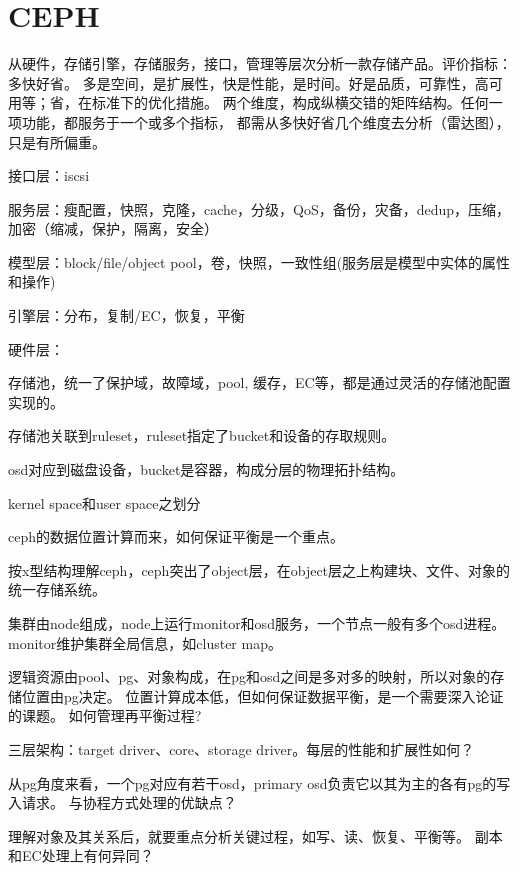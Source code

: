 \chapter{CEPH}

从硬件，存储引擎，存储服务，接口，管理等层次分析一款存储产品。评价指标：多快好省。
多是空间，是扩展性，快是性能，是时间。好是品质，可靠性，高可用等；省，在标准下的优化措施。
两个维度，构成纵横交错的矩阵结构。任何一项功能，都服务于一个或多个指标，
都需从多快好省几个维度去分析（雷达图），只是有所偏重。

\begin{enumbox}
\item 接口层：iscsi
\item 服务层：瘦配置，快照，克隆，cache，分级，QoS，备份，灾备，dedup，压缩，加密（缩减，保护，隔离，安全）
\item 模型层：block/file/object pool，卷，快照，一致性组(服务层是模型中实体的属性和操作)
\item 引擎层：分布，复制/EC，恢复，平衡
\item 硬件层：
\end{enumbox}

存储池，统一了保护域，故障域，pool, 缓存，EC等，都是通过灵活的存储池配置实现的。

存储池关联到ruleset，ruleset指定了bucket和设备的存取规则。

osd对应到磁盘设备，bucket是容器，构成分层的物理拓扑结构。

kernel space和user space之划分

ceph的数据位置计算而来，如何保证平衡是一个重点。

按x型结构理解ceph，ceph突出了object层，在object层之上构建块、文件、对象的统一存储系统。

集群由node组成，node上运行monitor和osd服务，一个节点一般有多个osd进程。
monitor维护集群全局信息，如cluster map。

逻辑资源由pool、pg、对象构成，在pg和osd之间是多对多的映射，所以对象的存储位置由pg决定。
位置计算成本低，但如何保证数据平衡，是一个需要深入论证的课题。
如何管理再平衡过程?

三层架构：target driver、core、storage driver。每层的性能和扩展性如何？

从pg角度来看，一个pg对应有若干osd，primary osd负责它以其为主的各有pg的写入请求。
与协程方式处理的优缺点？

理解对象及其关系后，就要重点分析关键过程，如写、读、恢复、平衡等。
副本和EC处理上有何异同？
